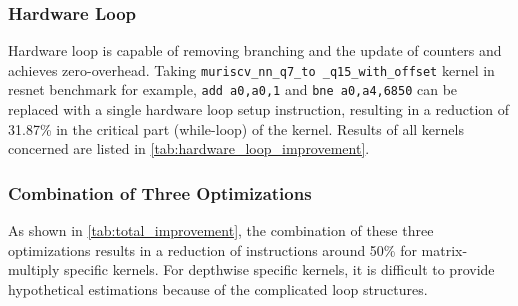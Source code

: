 \subsubsection{Hardware Loop}
Hardware loop is capable of removing branching and the update of counters and achieves zero-overhead. Taking \texttt{muriscv\_nn\_q7\_to \_q15\_with\_offset} kernel in resnet benchmark for example, \texttt{add a0,a0,1} and \texttt{bne a0,a4,6850} can be replaced with a single hardware loop setup instruction, resulting in a reduction of 31.87\% in the critical part (while-loop) of the kernel. Results of all kernels concerned are listed in \cref{tab:hardware_loop_improvement}.

\medskip
\begin{table}[ht!]
    \centering
    \caption{Instructions reduction in critical part of each kernel with hardware loop support. * means it is difficult to estimate the number hypothetically since the for-loop bodies are much more complicated.}
    \label{tab:hardware_loop_improvement}
\end{table}

\subsubsection{Combination of Three Optimizations}
As shown in \cref{tab:total_improvement}, the combination of these three optimizations results in a reduction of instructions around 50\% for matrix-multiply specific kernels. For depthwise specific kernels, it is difficult to provide hypothetical estimations because of the complicated loop structures.

